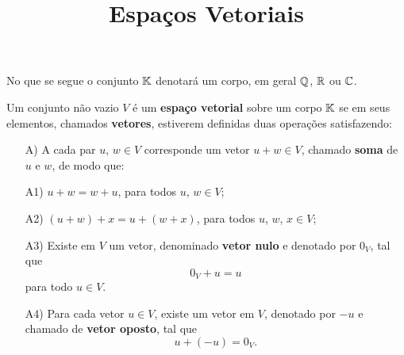 \documentclass{beamer}
\title{Espaços Vetoriais}
\author[\autor]{\autor}
\institute[\instituto]{\instituto}
\date{}
\begin{document}
\begin{frame}
  \maketitle
\end{frame}


\begin{frame}
  No que se segue o conjunto $\mathbb{K}$ denotará um corpo, em geral $\mathbb{Q}$, $\mathbb{R}$ ou $\mathbb{C}$.

  \vspace{.3cm}

  \begin{definicao}
    Um conjunto não vazio $V$  é um \textbf{espaço vetorial}  sobre um corpo $\mathbb{K}$  se em seus elementos, chamados \textbf{vetores},  estiverem definidas duas
    operações satisfazendo:
    \begin{itemize}
      \item[A)] A cada par $u$, $w \in V$  corresponde um vetor $u + w \in V$,  chamado \textbf{soma} de $u$ e $w$, de modo que:

        \vspace{.3cm}

      \item[A1)] $u + w  = w + u$,  para todos $u$, $w \in V$;

        \vspace{.3cm}

      \item[A2)] $(u + w)  + x  = u +  (w + x)$,  para todos $u$, $w$, $x \in V$;
    \end{itemize}
  \end{definicao}
\end{frame}

\begin{frame}
  \begin{definicao}
    \begin{itemize}
      \item[A3)] Existe em $V$ um vetor,  denominado \textbf{vetor nulo}  e denotado por $0_V$, tal que
        \[
          0_V + u  = u
        \]
        para todo $u \in V$.

        \vspace{.3cm}

      \item[A4)] Para cada vetor $u \in V$,  existe um vetor em $V$,  denotado por $-u$  e chamado de
        \textbf{vetor oposto}, tal que
        \[
          u + (-u)  = 0_V.
        \]
    \end{itemize}
  \end{definicao}
\end{frame}
\end{document}
